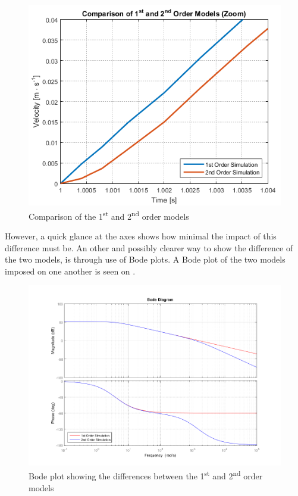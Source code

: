 \begin{minipage}{\linewidth}
\begin{minipage}{0.45\linewidth}
\begin{figure}[H]
    	 	\includegraphics[scale = .6]{figures/comparison1stAnd2ndOrderModelsZoom.png}
    	 	\caption{Comparison of the \si{1^{st}} and \si{2^{nd}} order models}
    	 	\label{fig:comparison1stAnd2ndOrderModelsZoom}
    	\end{figure}\vspace{-5mm}
  	\end{minipage}
  \end{minipage}
However, a quick glance at the axes shows how minimal the impact of this difference must be. An other and possibly clearer way to show the difference of the two models, is through use of Bode plots. A Bode plot of the two models imposed on one another is seen on .
%
\begin{figure}[H]
	\centering
	\includegraphics[width=0.95 \textwidth]{figures/bodePlotOf1stAnd2ndOrderModel.png}
	\caption{Bode plot showing the differences between the \si{1^{st}} and \si{2^{nd}} order models}
	\label{fig:bodePlotOf1stAnd2ndOrderModel}
\end{figure}\vspace{-5mm}
